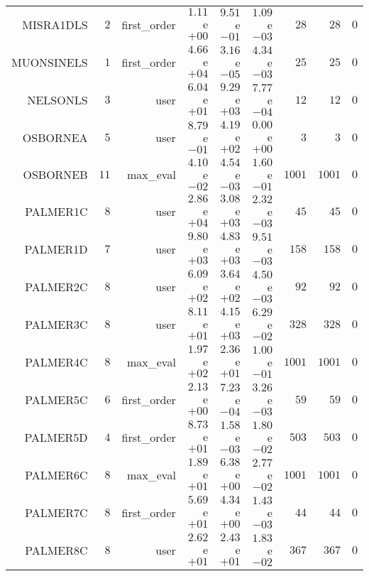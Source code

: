 \begin{longtable}{rrrrrrrrr}
MISRA1DLS & \(     2\) & first\_order & \( 1.11\)e\(+00\) & \( 9.51\)e\(-01\) & \( 1.09\)e\(-03\) & \(    28\) & \(    28\) & \(     0\) \\
MUONSINELS & \(     1\) & first\_order & \( 4.66\)e\(+04\) & \( 3.16\)e\(-05\) & \( 4.34\)e\(-03\) & \(    25\) & \(    25\) & \(     0\) \\
NELSONLS & \(     3\) & user & \( 6.04\)e\(+01\) & \( 9.29\)e\(+03\) & \( 7.77\)e\(-04\) & \(    12\) & \(    12\) & \(     0\) \\
OSBORNEA & \(     5\) & user & \( 8.79\)e\(-01\) & \( 4.19\)e\(+02\) & \( 0.00\)e\(+00\) & \(     3\) & \(     3\) & \(     0\) \\
OSBORNEB & \(    11\) & max\_eval & \( 4.10\)e\(-02\) & \( 4.54\)e\(-03\) & \( 1.60\)e\(-01\) & \(  1001\) & \(  1001\) & \(     0\) \\
PALMER1C & \(     8\) & user & \( 2.86\)e\(+04\) & \( 3.08\)e\(+03\) & \( 2.32\)e\(-03\) & \(    45\) & \(    45\) & \(     0\) \\
PALMER1D & \(     7\) & user & \( 9.80\)e\(+03\) & \( 4.83\)e\(+03\) & \( 9.51\)e\(-03\) & \(   158\) & \(   158\) & \(     0\) \\
PALMER2C & \(     8\) & user & \( 6.09\)e\(+02\) & \( 3.64\)e\(+02\) & \( 4.50\)e\(-03\) & \(    92\) & \(    92\) & \(     0\) \\
PALMER3C & \(     8\) & user & \( 8.11\)e\(+01\) & \( 4.15\)e\(+03\) & \( 6.29\)e\(-02\) & \(   328\) & \(   328\) & \(     0\) \\
PALMER4C & \(     8\) & max\_eval & \( 1.97\)e\(+02\) & \( 2.36\)e\(+01\) & \( 1.00\)e\(-01\) & \(  1001\) & \(  1001\) & \(     0\) \\
PALMER5C & \(     6\) & first\_order & \( 2.13\)e\(+00\) & \( 7.23\)e\(-04\) & \( 3.26\)e\(-03\) & \(    59\) & \(    59\) & \(     0\) \\
PALMER5D & \(     4\) & first\_order & \( 8.73\)e\(+01\) & \( 1.58\)e\(-03\) & \( 1.80\)e\(-02\) & \(   503\) & \(   503\) & \(     0\) \\
PALMER6C & \(     8\) & max\_eval & \( 1.89\)e\(+01\) & \( 6.38\)e\(+00\) & \( 2.77\)e\(-02\) & \(  1001\) & \(  1001\) & \(     0\) \\
PALMER7C & \(     8\) & first\_order & \( 5.69\)e\(+01\) & \( 4.34\)e\(+00\) & \( 1.43\)e\(-03\) & \(    44\) & \(    44\) & \(     0\) \\
PALMER8C & \(     8\) & user & \( 2.62\)e\(+01\) & \( 2.43\)e\(+01\) & \( 1.83\)e\(-02\) & \(   367\) & \(   367\) & \(     0\) \\

\end{longtable}
